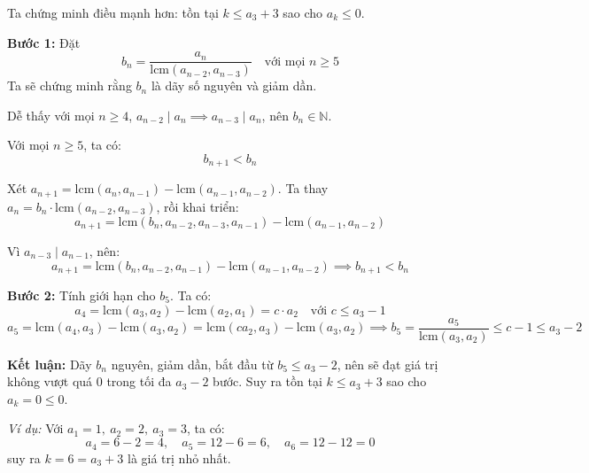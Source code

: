 \documentclass[../01-divisibility.tex]{subfiles}
\begin{document}
\begin{soln}\footnotemark
	Ta chứng minh điều mạnh hơn: tồn tại \( k \leq a_3 + 3 \) sao cho \( a_k \leq 0 \).

	\textbf{Bước 1:} Đặt
	\[
		b_n = \frac{a_n}{\text{lcm}(a_{n-2}, a_{n-3})} \quad \text{với mọi } n \geq 5
	\]
	Ta sẽ chứng minh rằng \( b_n \) là dãy số nguyên và giảm dần.

	Dễ thấy với mọi \( n \geq 4 \), \( a_{n-2} \mid a_n \implies a_{n-3} \mid a_n \), nên \( b_n \in \mathbb{N} \).

	\begin{claim*}
		Với mọi \( n \geq 5 \), ta có:
		\[
			b_{n+1} < b_n
		\]
	\end{claim*}
	\begin{subproof}
		Xét \( a_{n+1} = \text{lcm}(a_n, a_{n-1}) - \text{lcm}(a_{n-1}, a_{n-2}) \). Ta thay \( a_n = b_n \cdot \text{lcm}(a_{n-2}, a_{n-3}) \), rồi khai triển:
		\[
			a_{n+1} = \text{lcm}(b_n, a_{n-2}, a_{n-3}, a_{n-1}) - \text{lcm}(a_{n-1}, a_{n-2})
		\]

		Vì \( a_{n-3} \mid a_{n-1} \), nên:
		\[
			a_{n+1} = \text{lcm}(b_n, a_{n-2}, a_{n-1}) - \text{lcm}(a_{n-1}, a_{n-2}) \implies b_{n+1} < b_n
		\]
	\end{subproof}

	\textbf{Bước 2:} Tính giới hạn cho \( b_5 \). Ta có:
	\[
		a_4 = \text{lcm}(a_3, a_2) - \text{lcm}(a_2, a_1) = c \cdot a_2 \quad \text{với } c \leq a_3 - 1
	\]
	\[
		a_5 = \text{lcm}(a_4, a_3) - \text{lcm}(a_3, a_2) = \text{lcm}(c a_2, a_3) - \text{lcm}(a_3, a_2)
	\implies b_5 = \frac{a_5}{\text{lcm}(a_3, a_2)} \leq c - 1 \leq a_3 - 2
	\]

	\textbf{Kết luận:} Dãy \( b_n \) nguyên, giảm dần, bắt đầu từ \( b_5 \leq a_3 - 2 \), nên sẽ đạt giá trị không vượt quá 0 trong tối đa \( a_3 - 2 \) bước. Suy ra tồn tại \( k \leq a_3 + 3 \) sao cho \( a_k = 0 \leq 0 \).

	\textit{Ví dụ:} Với \( a_1 = 1,\ a_2 = 2,\ a_3 = 3 \), ta có:
	\[
		a_4 = 6 - 2 = 4,\quad a_5 = 12 - 6 = 6,\quad a_6 = 12 - 12 = 0
	\]
	suy ra \( k = 6 = a_3 + 3 \) là giá trị nhỏ nhất.
\end{soln}

\end{document}
